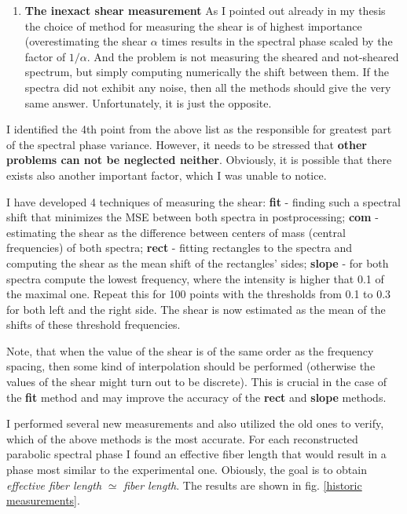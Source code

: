 \documentclass{article}
\begin{document}
\begin{enumerate}
\item \textbf{The inexact shear measurement} As I pointed out already in my thesis the choice of method for measuring the shear is of highest importance (overestimating the shear $\alpha$ times results in the spectral phase scaled by the factor of $1/\alpha$. And the problem is not measuring the sheared and not-sheared spectrum, but simply computing numerically the shift between them. If the spectra did not exhibit any noise, then all the methods should give the very same answer. Unfortunately, it is just the opposite. 
\end{enumerate}

I identified the 4th point from the above list as the responsible for greatest part of the spectral phase variance. However, it needs to be stressed that \textbf{other problems can not be neglected neither}. Obviously, it is possible that there exists also another important factor, which I was unable to notice.

I have developed 4 techniques of measuring the shear: \textbf{fit} - finding such a spectral shift that minimizes the MSE between both spectra in postprocessing; \textbf{com} - estimating the shear as the difference between centers of mass (central frequencies) of both spectra; \textbf{rect} - fitting rectangles to the spectra and computing the shear as the mean shift of the rectangles' sides;  \textbf{slope} - for both spectra compute the lowest frequency, where the intensity is higher that 0.1 of the maximal one. Repeat this for 100 points with the thresholds from 0.1 to 0.3 for both left and the right side. The shear is now estimated as the mean of the shifts of these threshold frequencies. 

Note, that when the value of the shear is of the same order as the frequency spacing, then some kind of interpolation should be performed (otherwise the values of the shear might turn out to be discrete). This is crucial in the case of the \textbf{fit} method and may improve the accuracy of the \textbf{rect} and \textbf{slope} methods.

I performed several new measurements and also utilized the old ones to verify, which of the above methods is the most accurate. For each reconstructed parabolic spectral phase I found an effective fiber length that would result in a phase most similar to the experimental one. Obiously, the goal is to obtain \emph{effective fiber length} $\simeq$ \emph{fiber length}. The results are shown in fig. \ref{historic measurements}.
\end{document}
